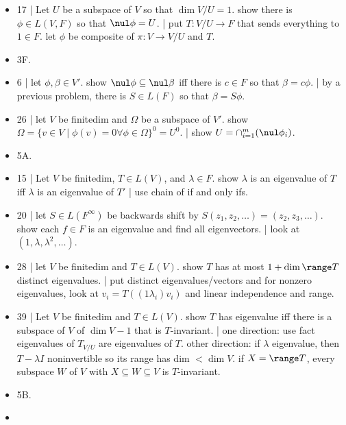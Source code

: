 \begin{itemize}
	\item 17 | Let $U$ be a subspace of $V$ so that $\dim V/U = 1$. show there is $\phi \in L(V,F)$ so that $\nul\phi = U$. | put $T: V/U \to F$ that sends everything to $1 \in F$. let $\phi$ be composite of $\pi: V \to V/U$ and $T$. 
	\item 3F. 
	\item 6 | let $\phi,\beta \in V'$. show $\nul\phi \subseteq \nul\beta$ iff there is $c \in F$ so that $\beta = c\phi$. | by a previous problem, there is $S \in L(F)$ so that $\beta = S\phi$. 
	\item 26 | let $V$ be finitedim and $\Omega$ be a subspace of $V'$. show $\Omega = \{v \in V \mid \phi(v)=0 \forall \phi \in \Omega\}^0 = U^0$. | show $U = \cap_{i=1}^{m} (\nul \phi_i)$. 
	\item 5A. 
	\item 15 | Let $V$ be finitedim, $T \in L(V)$, and $\lambda \in F$. show $\lambda$ is an eigenvalue of $T$ iff $\lambda$ is an eigenvalue of $T'$ | use chain of if and only ifs. 
	\item 20 | let $S \in L(F^\infty)$ be backwards shift by $S(z_1,z_2,\dots) = (z_2,z_3,\dots)$. show each $f \in F$ is an eigenvalue and find all eigenvectors. | look at $(1,\lambda,\lambda^2,\dots)$. 
	\item 28 | let $V$ be finitedim and $T \in L(V)$. show $T$ has at most $1 + \dim\range T$ distinct eigenvalues. | put distinct eigenvalues/vectors and for nonzero eigenvalues, look at $v_i = T((1\lambda_i)v_i)$ and linear independence and range. 
	\item 39 | Let $V$ be finitedim and $T \in L(V)$. show $T$ has eigenvalue iff there is a subspace of $V$ of $\dim V - 1$ that is $T$-invariant. | one direction: use fact eigenvalues of $T_{V/U}$ are eigenvalues of $T$. other direction: if $\lambda$ eigenvalue, then $T-\lambda I$ noninvertible so its range has dim $< \dim V$. if $X = \range T$, every subspace $W$ of $V$ with $X \subseteq W \subseteq V$ is $T$-invariant. 
	\item 5B. 
	\item 
\end{itemize}


